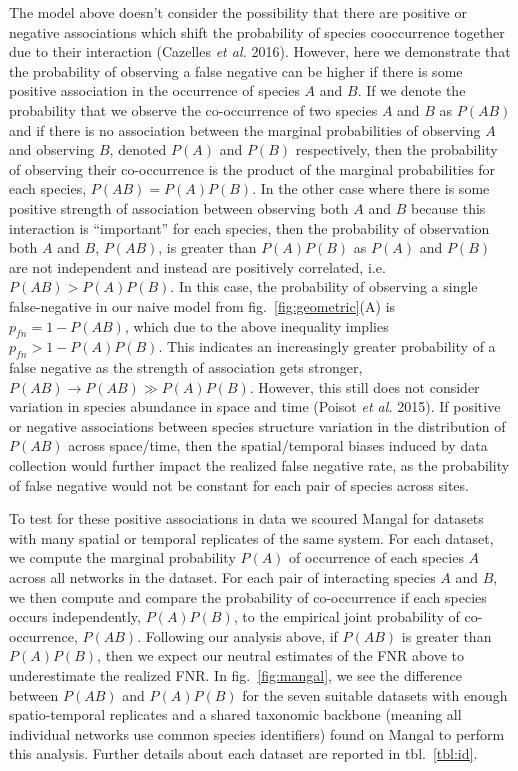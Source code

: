 \documentclass[10pt,oneside]{article}
\begin{document}
The model above doesn't consider the possibility that there are positive
or negative associations which shift the probability of species
cooccurrence together due to their interaction (Cazelles \emph{et al.}
2016). However, here we demonstrate that the probability of observing a
false negative can be higher if there is some positive association in
the occurrence of species \(A\) and \(B\). If we denote the probability
that we observe the co-occurrence of two species \(A\) and \(B\) as
\(P(AB)\) and if there is no association between the marginal
probabilities of observing \(A\) and observing \(B\), denoted \(P(A)\)
and \(P(B)\) respectively, then the probability of observing their
co-occurrence is the product of the marginal probabilities for each
species, \(P(AB) = P(A)P(B)\). In the other case where there is some
positive strength of association between observing both \(A\) and \(B\)
because this interaction is ``important'' for each species, then the
probability of observation both \(A\) and \(B\), \(P(AB)\), is greater
than \(P(A)P(B)\) as \(P(A)\) and \(P(B)\) are not independent and
instead are positively correlated, i.e.~\(P(AB)> P(A)P(B)\). In this
case, the probability of observing a single false-negative in our naive
model from fig.~\ref{fig:geometric}(A) is \(p_{fn}= 1-P(AB)\), which due
to the above inequality implies \(p_{fn}>1-P(A)P(B)\). This indicates an
increasingly greater probability of a false negative as the strength of
association gets stronger, \(P(AB) \to P(AB) \gg P(A)P(B)\). However,
this still does not consider variation in species abundance in space and
time (Poisot \emph{et al.} 2015). If positive or negative associations
between species structure variation in the distribution of \(P(AB)\)
across space/time, then the spatial/temporal biases induced by data
collection would further impact the realized false negative rate, as the
probability of false negative would not be constant for each pair of
species across sites.

To test for these positive associations in data we scoured Mangal for
datasets with many spatial or temporal replicates of the same system.
For each dataset, we compute the marginal probability \(P(A)\) of
occurrence of each species \(A\) across all networks in the dataset. For
each pair of interacting species \(A\) and \(B\), we then compute and
compare the probability of co-occurrence if each species occurs
independently, \(P(A)P(B)\), to the empirical joint probability of
co-occurrence, \(P(AB)\). Following our analysis above, if \(P(AB)\) is
greater than \(P(A)P(B)\), then we expect our neutral estimates of the
FNR above to underestimate the realized FNR. In fig.~\ref{fig:mangal},
we see the difference between \(P(AB)\) and \(P(A)P(B)\) for the seven
suitable datasets with enough spatio-temporal replicates and a shared
taxonomic backbone (meaning all individual networks use common species
identifiers) found on Mangal to perform this analysis. Further details
about each dataset are reported in tbl.~\ref{tbl:id}.
\end{document}
